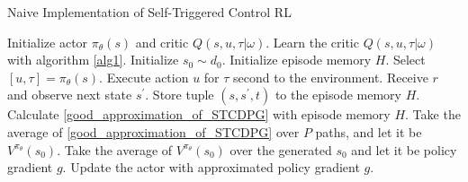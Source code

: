 \documentclass[english, dvipdfmx]{ampmt}             %
\begin{document}
\begin{algorithm}                      
\caption{Naive Implementation of Self-Triggered Control RL}         
\label{alg2}                          
\begin{algorithmic}                  
    \STATE Initialize actor $\pi_{\theta}(s)$ and critic $Q(s,u,\tau|\omega)$.
    \STATE Learn the critic $Q(s,u,\tau|\omega)$ with algorithm \ref{alg1}.
            \STATE Initialize $s_0\sim d_0$.
            \STATE Initialize episode memory $H$.
                \STATE Select $[u, \tau] = \pi_{\theta}(s)$.
                \STATE Execute action $u$ for $\tau$ second to the environment.
                \STATE Receive $r$ and observe next state $s^{\prime}$.
                \STATE Store tuple $(s, s^{\prime}, t)$ to the episode memory $H$.
            \ENDWHILE
            \STATE Calculate \eqref{good_approximation_of_STCDPG} with episode memory $H$.
        \ENDFOR
        \STATE Take the average of \eqref{good_approximation_of_STCDPG} over $P$ paths, and let it be $V^{\pi_{\theta}}(s_0)$.
        \ENDFOR
    \ENDFOR
    \STATE Take the average of $V^{\pi_{\theta}}(s_0)$ over the generated $s_0$ and let it be policy gradient $g$.
    \STATE Update the actor with approximated policy gradient $g$.
   \end{algorithmic}
\end{algorithm}
\end{document}
